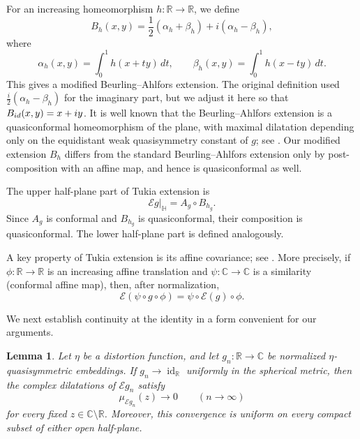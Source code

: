 \documentclass[10pt,a4paper]{amsart}
\numberwithin{equation}{section}
\newtheorem{lemma}[theorem]{Lemma}
\newcommand{\R}{\mathbb{R}}
\newcommand{\C}{\mathbb{C}}
\newcommand{\Hh}{\mathbb{H}}
\newcommand{\id}{\operatorname{id}}
\begin{document}
For an increasing homeomorphism $h\colon\R\to\R$, we define
\begin{equation*}
 B_h(x,y)=\frac12(\alpha_h+\beta_h)
 +i(\alpha_h-\beta_h),
\end{equation*}
where
\begin{equation}\label{eq:alphabeta}
 \alpha_h(x,y)=\int_0^1h(x+ty)\,dt,
 \qquad
 \beta_h(x,y)=\int_0^1h(x-ty)\,dt.
\end{equation}
This gives a modified Beurling--Ahlfors extension. The original definition used $\frac{i}{2}(\alpha_h-\beta_h)$ for the imaginary part, but we adjust it here so that $B_{\rm id}(x,y)=x+iy$. 
It is well known that the Beurling--Ahlfors extension is a quasiconformal homeomorphism of the plane, with maximal dilatation depending only on the equidistant weak quasisymmetry constant of $g$; see \cite[Section~6]{BA}. 
Our modified extension $B_h$ differs from the standard Beurling--Ahlfors extension only by post-composition with an affine map, and hence is quasiconformal as well.

The upper half-plane part of Tukia extension is
\begin{equation*}
 \mathcal E g|_{\Hh}=A_g\circ B_{h_g}.
\end{equation*}
Since $A_g$ is conformal and $B_{h_g}$ is quasiconformal, their composition is quasiconformal.
The lower half-plane part is defined analogously. 

A key property of Tukia extension is its affine covariance; see \cite[Section~5]{TukiaExtension}. More precisely, if $\phi\colon\R\to\R$ is an increasing affine translation and $\psi\colon\C\to\C$ is a similarity (conformal affine map), then, after normalization,
\begin{equation}\label{eq:Tukia-naturality}
 \mathcal E(\psi\circ g\circ\phi)
 =\psi\circ\mathcal E(g)\circ\phi.
\end{equation}

We next establish continuity at the identity in a form convenient for our arguments.

\begin{lemma}\label{lem:extension-continuity}
Let $\eta$ be a distortion function, and let $g_n\colon\R\to\C$ be normalized $\eta$-quasisymmetric embeddings.  
If $g_n\to\id_{\R}$ uniformly in the spherical metric, then the complex dilatations of $\mathcal{E}g_n$ satisfy
\[
 \mu_{\mathcal Eg_n}(z)\to 0 \qquad (n\to\infty)
\]
for every fixed $z\in\C\setminus\R$.
Moreover, this convergence is uniform on every compact subset of either open half-plane.
\end{lemma}
\end{document}
